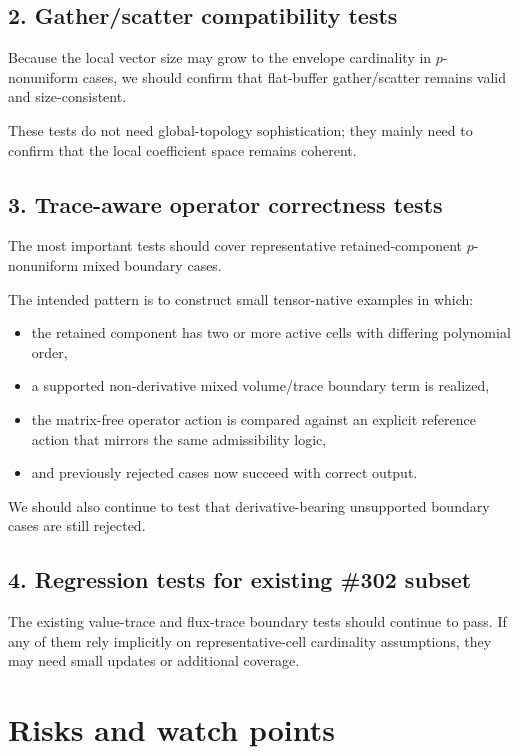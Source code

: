 \documentclass[11pt]{article}
\begin{document}
\subsection{2. Gather/scatter compatibility tests}

Because the local vector size may grow to the envelope cardinality in \(p\)-nonuniform cases, we should confirm that flat-buffer gather/scatter remains valid and size-consistent.

These tests do not need global-topology sophistication; they mainly need to confirm that the local coefficient space remains coherent.

\subsection{3. Trace-aware operator correctness tests}

The most important tests should cover representative retained-component \(p\)-nonuniform mixed boundary cases.

The intended pattern is to construct small tensor-native examples in which:
\begin{itemize}[leftmargin=*]
  \item the retained component has two or more active cells with differing polynomial order,
  \item a supported non-derivative mixed volume/trace boundary term is realized,
  \item the matrix-free operator action is compared against an explicit reference action that mirrors the same admissibility logic,
  \item and previously rejected cases now succeed with correct output.
\end{itemize}

We should also continue to test that derivative-bearing unsupported boundary cases are still rejected.

\subsection{4. Regression tests for existing \#302 subset}

The existing value-trace and flux-trace boundary tests should continue to pass. If any of them rely implicitly on representative-cell cardinality assumptions, they may need small updates or additional coverage.

\section{Risks and watch points}
\end{document}
